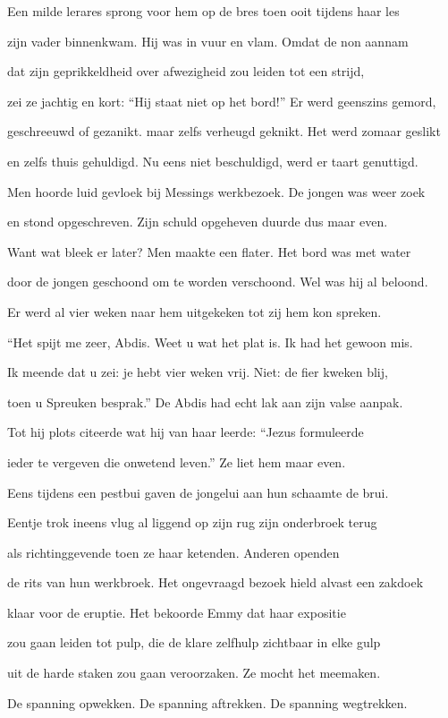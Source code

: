 Een milde lerares
sprong voor hem op de bres
toen ooit tijdens haar les

zijn vader binnenkwam.
Hij was in vuur en vlam.
Omdat de non aannam

dat zijn geprikkeldheid
over afwezigheid
zou leiden tot een strijd,

zei ze jachtig en kort:
“Hij staat niet op het bord!”
Er werd geenszins gemord,

geschreeuwd of gezanikt.
maar zelfs verheugd geknikt.
Het werd zomaar geslikt

en zelfs thuis gehuldigd.
Nu eens niet beschuldigd,
werd er taart genuttigd.

Men hoorde luid gevloek
bij Messings werkbezoek.
De jongen was weer zoek

en stond opgeschreven.
Zijn schuld opgeheven
duurde dus maar even.

Want wat bleek er later?
Men maakte een flater.
Het bord was met water

door de jongen geschoond
om te worden verschoond.
Wel was hij al beloond.

Er werd al vier weken
naar hem uitgekeken
tot zij hem kon spreken.

“Het spijt me zeer, Abdis.
Weet u wat het plat is.
Ik had het gewoon mis.

Ik meende dat u zei:
je hebt vier weken vrij.
Niet: de fier kweken blij,

toen u Spreuken besprak.”
De Abdis had echt lak
aan zijn valse aanpak.

Tot hij plots citeerde
wat hij van haar leerde:
“Jezus formuleerde

ieder te vergeven
die onwetend leven.”
Ze liet hem maar even.

Eens tijdens een pestbui
gaven de jongelui
aan hun schaamte de brui.

Eentje trok ineens vlug
al liggend op zijn rug
zijn onderbroek terug

als richtinggevende
toen ze haar ketenden.
Anderen openden

de rits van hun werkbroek.
Het ongevraagd bezoek
hield alvast een zakdoek

klaar voor de eruptie.
Het bekoorde Emmy
dat haar expositie

zou gaan leiden tot pulp,
die de klare zelfhulp
zichtbaar in elke gulp

uit de harde staken
zou gaan veroorzaken.
Ze mocht het meemaken.

De spanning opwekken.
De spanning aftrekken.
De spanning wegtrekken.

